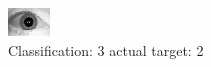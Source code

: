 \begin{figure}[h!]
\begin{center}
\includegraphics[width=0.60\columnwidth]{figures/ID1635_class_3_target_2.png}
\end{center}
\caption{ Classification: 3 actual target: 2}
\label{fig:ID1635_class_3_target_2}
\end{figure}
